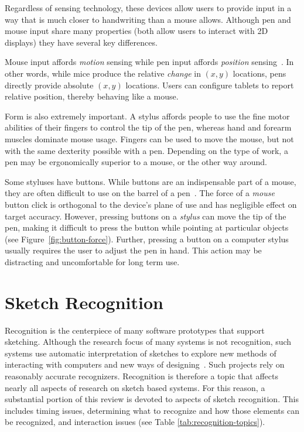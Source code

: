 Regardless of sensing technology, these devices allow users to provide
input in a way that is much closer to handwriting than a mouse
allows. Although pen and mouse input share many properties (both allow
users to interact with 2D displays) they have several key differences.

Mouse input affords \textit{motion} sensing while pen input
affords \textit{position} sensing~\cite{hinckley-input-technology}. In
other words, while mice produce the relative \textit{change} in
$(x,y)$ locations, pens directly provide absolute $(x,y)$ locations.
Users can configure tablets to report relative position, thereby
behaving like a mouse.

Form is also extremely important. A stylus affords people to use the
fine motor abilities of their fingers to control the tip of the pen,
whereas hand and forearm muscles dominate mouse usage. Fingers can be
used to move the mouse, but not with the same dexterity possible with
a pen. Depending on the type of work, a pen may be ergonomically
superior to a mouse, or the other way around.



Some styluses have buttons. While buttons are an indispensable part of
a mouse, they are often difficult to use on the barrel of a
pen~\cite{plimmer-pen-usability}. The force of a \textit{mouse} button
click is orthogonal to the device's plane of use and has negligible
effect on target accuracy. However, pressing buttons on a
\textit{stylus} can move the tip of the pen, making it difficult to
press the button while pointing at particular objects (see
Figure~\ref{fig:button-force}). Further, pressing a button on a
computer stylus usually requires the user to adjust the pen in
hand. This action may be distracting and uncomfortable for long term
use.

\section{Sketch Recognition}

Recognition is the centerpiece of many software prototypes that
support sketching. Although the research focus of many systems is not
recognition, such systems use automatic interpretation of sketches to
explore new methods of interacting with computers and new ways of
designing~\cite{gross-boe,grundy-maramasketch,lin-denim}. Such
projects rely on reasonably accurate recognizers. Recognition is
therefore a topic that affects nearly all aspects of research on
sketch based systems. For this reason, a substantial portion of this
review is devoted to aspects of sketch recognition. This includes
timing issues, determining what to recognize and how those elements
can be recognized, and interaction issues (see
Table \ref{tab:recognition-topics}).

